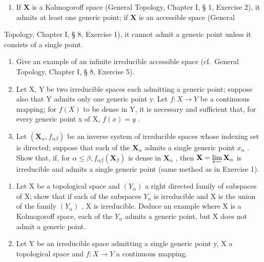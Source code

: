 \begin{enumerate}
\def\labelenumi{(\alph{enumi})}
\tightlist
\item
  If \(\mathbf{X}\) is a Kolmogoroff space (General Topology, Chapter I, § 1, Exercise 2), it admits at least one generic point; if \(\mathbf{X}\) is an accessible space (General
\end{enumerate}

Topology, Chapter I, § 8, Exercise 1), it cannot admit a generic point unless it consists of a single point.

\begin{enumerate}
\def\labelenumi{(\alph{enumi})}
\setcounter{enumi}{1}
\item
  Give an example of an infinite irreducible accessible space (cf.~General Topology, Chapter I, § 8, Exercise 5).
\item
  Let X, Y be two irreducible spaces each admitting a generic point; suppose also that Y admits only one generic point y. Let \(f: X \to Y\) be a continuous mapping; for \(f(X)\) to be dense in Y, it is necessary and sufficient that, for every generic point x of X, \(f(x) = y\) .
\item
  Let \((\mathbf{X}_{\alpha}, f_{\alpha \beta})\) be an inverse system of irreducible spaces whose indexing set is directed; suppose that each of the \(\mathbf{X}_{\alpha}\) admits a single generic point \(x_{\alpha}\) . Show that, if, for \(\alpha \leqslant \beta, f_{\alpha \beta}(\mathbf{X}_{\beta})\) is dense in \(\mathbf{X}_{\alpha}\) , then \(\mathbf{X} = \varprojlim \mathbf{X}_{\alpha}\) is irreducible and admits a single generic point (same method as in Exercise 1).
\end{enumerate}

\begin{enumerate}
\def\labelenumi{\arabic{enumi}.}
\setcounter{enumi}{2}
\item
  Let X be a topological space and \((Y_{\alpha})\) a right directed family of subspaces of X; show that if each of the subspaces \(Y_{\alpha}\) is irreducible and X is the union of the family \((Y_{\alpha})\) , X is irreducible. Deduce an example where X is a Kolmogoroff space, each of the \(Y_{\alpha}\) admits a generic point, but X does not admit a generic point.
\item
  Let Y be an irreducible space admitting a single generic point y, X a topological space and \(f: X \rightarrow Y\) a continuous mapping.
\end{enumerate}

